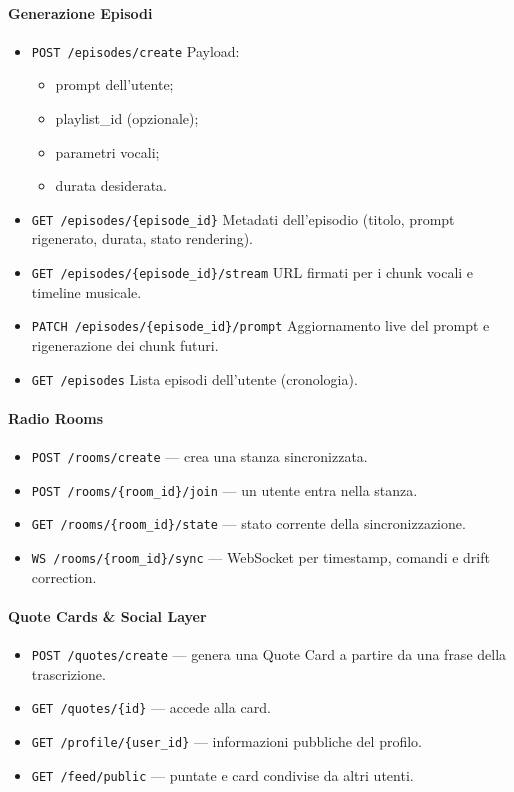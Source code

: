 \documentclass[11pt,a4paper]{article}
\begin{document}
\paragraph{Generazione Episodi}
\begin{itemize}
    \item \verb|POST /episodes/create|  
    Payload:
    \begin{itemize}
        \item prompt dell’utente;
        \item playlist\_id (opzionale);
        \item parametri vocali;
        \item durata desiderata.
    \end{itemize}

    \item \verb|GET /episodes/{episode_id}|  
    Metadati dell’episodio (titolo, prompt rigenerato, durata, stato rendering).

    \item \verb|GET /episodes/{episode_id}/stream|  
    URL firmati per i chunk vocali e timeline musicale.

    \item \verb|PATCH /episodes/{episode_id}/prompt|  
    Aggiornamento live del prompt e rigenerazione dei chunk futuri.

    \item \verb|GET /episodes|  
    Lista episodi dell’utente (cronologia).
\end{itemize}

\paragraph{Radio Rooms}
\begin{itemize}
    \item \verb|POST /rooms/create| — crea una stanza sincronizzata.
    \item \verb|POST /rooms/{room_id}/join| — un utente entra nella stanza.
    \item \verb|GET /rooms/{room_id}/state| — stato corrente della sincronizzazione.
    \item \verb|WS /rooms/{room_id}/sync| — WebSocket per timestamp, comandi e drift correction.
\end{itemize}

\paragraph{Quote Cards \& Social Layer}
\begin{itemize}
    \item \verb|POST /quotes/create| — genera una Quote Card a partire da una frase della trascrizione.
    \item \verb|GET /quotes/{id}| — accede alla card.
    \item \verb|GET /profile/{user_id}| — informazioni pubbliche del profilo.
    \item \verb|GET /feed/public| — puntate e card condivise da altri utenti.
\end{itemize}
\end{document}
